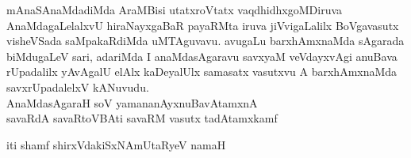 
\begin{artha}
mAnaSAnaMdadiMda AraMBisi utatxroVtatx vaqdhidhxgoMDiruva AnaMdagaLelalxvU hiraNayxgaBaR payaRMta iruva jiVvigaLalilx BoVgavasutx visheVSada saMpakaRdiMda uMTAguvavu. avugaLu barxhAmxnaMda sAgarada biMdugaLeV sari, adariMda I anaMdasAgaravu savxyaM veVdayxvAgi anuBava rUpadalilx yAvAgalU elAlx kaDeyalUlx samasatx vasutxvu A barxhAmxnaMda savxrUpadalelxV kANuvudu.\\
AnaMdasAgaraH soV yamananAyxnuBavAtamxnA \\
savaRdA savaRtoVBAti savaRM vasutx tadAtamxkamf 
\end{artha}


\begin{center}
iti shamf shirxVdakiSxNAmUtaRyeV namaH
\end{center}

